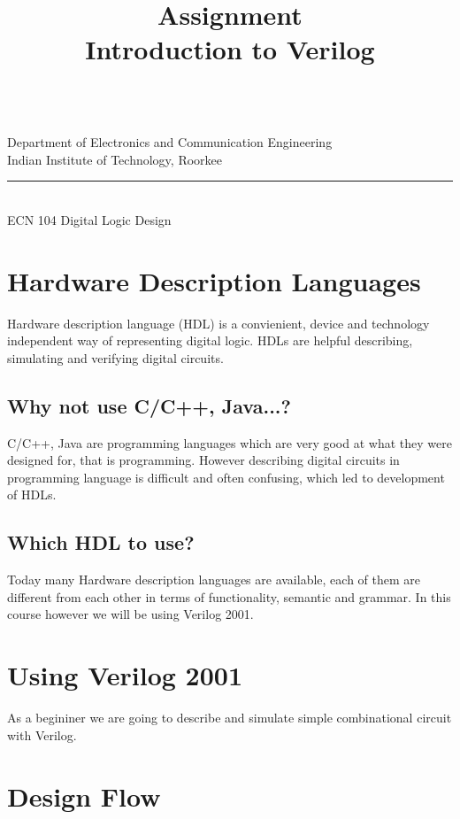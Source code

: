 \documentclass[a4paper,10pt]{article}
\makeatletter
\newcommand{\linia}{\rule{\linewidth}{0.5pt}}
\newcommand{\ano}{\text{1}}
\theoremstyle{mytheor}
\renewcommand{\maketitle}{
\begin{center}
\vspace{2ex}
{\huge \textsc{\@title}}
\vspace{1ex}
\\
Department of Electronics and Communication Engineering \\
Indian Institute of Technology, Roorkee
\linia\\
ECN 104 \hfill Digital Logic Design
\vspace{4ex}
\end{center}
}
\makeatother
\begin{document}
\title{Assignment \ano \\ Introduction to Verilog}

\maketitle

\section*{Hardware Description Languages}
Hardware description language (HDL) is a convienient, device and technology independent way of representing digital logic. HDLs are helpful describing, simulating and verifying digital circuits.

\subsection*{Why not use C/C++, Java...?} 
C/C++, Java are programming languages which are very good at what they were designed for, that is programming. However describing digital circuits in programming language is difficult and often confusing, which led to development of HDLs.

\subsection*{Which HDL to use?}
Today many Hardware description languages are available, each of them are different from each other in terms of functionality, semantic and grammar. In this course however we will be using Verilog  2001.

\section*{Using Verilog 2001}
As a begininer we are going to describe and simulate simple combinational circuit with Verilog.

\section*{Design Flow}  
\end{document}
